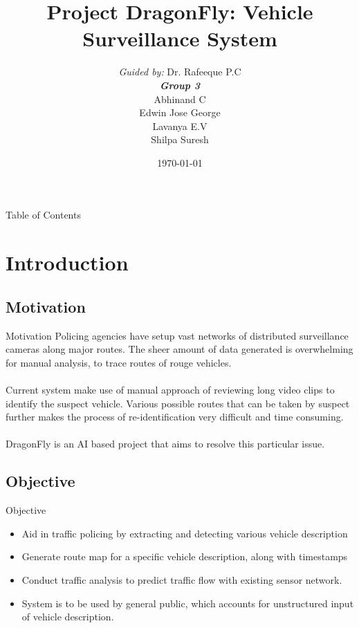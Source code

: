 \documentclass{beamer}
\title[DragonFly]{Project DragonFly: Vehicle Surveillance System}
\institute[GCEK-CSE]{Department of Computer Science and Engineering \\Government College of Engineering Kannur}
\author[Group 3]{
	{\small \textit{Guided by:}} Dr. Rafeeque P.C \\
	\medskip
	{\small \textbf{\textit{Group 3}}} \\
	Abhinand C \\ Edwin Jose George \\ Lavanya E.V \\ Shilpa Suresh
}
\date{\today}
\begin{document}
	

	\begin{frame}
	\titlepage
	\end{frame}

	\begin{frame}{Table of Contents}
	\tableofcontents
	\end{frame}



	\section{Introduction}
	\subsection{Motivation}
	\begin{frame}{Motivation}		
		Policing agencies have setup vast networks of distributed surveillance cameras along major routes. The sheer amount of data generated is overwhelming for manual analysis, to trace routes of rouge vehicles.\\~\\
		
		Current system make use of manual approach of reviewing long video
		clips to identify the suspect vehicle. Various possible routes that can
		be taken by suspect further makes the process of re-identification very
		difficult and time consuming.\\~\\
				
		DragonFly is an AI based project that aims to resolve this particular issue. 
	\end{frame}

	\subsection{Objective}
	\begin{frame}{Objective}
		\begin{itemize}
			\item Aid in traffic policing by extracting and detecting various vehicle
			description
			\item Generate route map for a specific vehicle description, along with
			timestamps
			\item Conduct traffic analysis to predict traffic flow with existing sensor
			network.
			\item System is to be used by general public, which accounts for
			unstructured input of vehicle description.
		\end{itemize}
	\end{frame}
\end{document}

